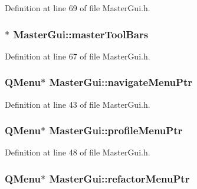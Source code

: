 Definition at line 69 of file Master\-Gui.\-h.

\hypertarget{class_master_gui_afb90e8f19dae43cb78c8495e5708e68b}{
\subsubsection[{master\-Tool\-Bars}]{$\ast$ Master\-Gui\-::master\-Tool\-Bars\hspace{0.3cm}{\ttfamily [private]}}}\label{class_master_gui_afb90e8f19dae43cb78c8495e5708e68b}


Definition at line 67 of file Master\-Gui.\-h.

\hypertarget{class_master_gui_aec75bd894b1c0eecea35c67ecdfcf1b0}{
\subsubsection[{navigate\-Menu\-Ptr}]{\setlength{\rightskip}{0pt plus 5cm}Q\-Menu$\ast$ Master\-Gui\-::navigate\-Menu\-Ptr\hspace{0.3cm}{\ttfamily [private]}}}\label{class_master_gui_aec75bd894b1c0eecea35c67ecdfcf1b0}


Definition at line 43 of file Master\-Gui.\-h.

\hypertarget{class_master_gui_a9c0ef6beee1cb9afcfff786bc4c6bd06}{
\subsubsection[{profile\-Menu\-Ptr}]{\setlength{\rightskip}{0pt plus 5cm}Q\-Menu$\ast$ Master\-Gui\-::profile\-Menu\-Ptr\hspace{0.3cm}{\ttfamily [private]}}}\label{class_master_gui_a9c0ef6beee1cb9afcfff786bc4c6bd06}


Definition at line 48 of file Master\-Gui.\-h.

\hypertarget{class_master_gui_a44e789008fcc276a7a4294beb98d02c7}{
\subsubsection[{refactor\-Menu\-Ptr}]{\setlength{\rightskip}{0pt plus 5cm}Q\-Menu$\ast$ Master\-Gui\-::refactor\-Menu\-Ptr\hspace{0.3cm}{\ttfamily [private]}}}\label{class_master_gui_a44e789008fcc276a7a4294beb98d02c7}


